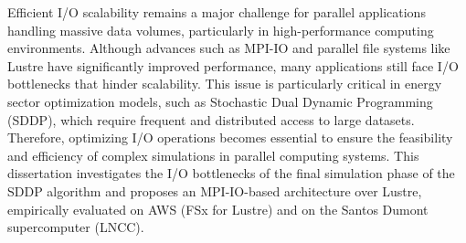 \documentclass[msc]{coppe}
\begin{document}
  \begin{abstract}
  A escalabilidade eficiente de E/S continua sendo um desafio crítico em
  aplicações paralelas de dados massivos, especialmente em sistemas de alto
  desempenho que lidam com grandes volumes de dados. Embora avanços como o uso
  de MPI-IO e sistemas de arquivos paralelos como o Lustre tenham contribuído
  significativamente, muitas aplicações ainda enfrentam gargalos que
  comprometem a performance. Esse problema é particularmente evidente em
  modelos de otimização utilizados no setor energético, como o SDDP, que
  demandam acesso frequente e distribuído a grandes conjuntos de dados. A
  eficiência da E/S torna-se, assim, um fator decisivo para a viabilidade e o
  desempenho de simulações complexas em ambientes paralelos. Esta dissertação
  investiga os gargalos de E/S da fase de simulação final do algoritmo SDDP e propõe uma arquitetura baseada em MPI-IO sobre Lustre, avaliada empiricamente nos
  ambientes AWS (FSx for Lustre) e Santos Dumont (LNCC).
  \end{abstract}

  \begin{foreignabstract}
  Efficient I/O scalability remains a major challenge for parallel
  applications handling massive data volumes, particularly in
  high-performance computing environments. Although advances such as MPI-IO
  and parallel file systems like Lustre have significantly improved
  performance, many applications still face I/O bottlenecks that hinder
  scalability. This issue is particularly critical in energy sector
  optimization models, such as Stochastic Dual Dynamic Programming (SDDP),
  which require frequent and distributed access to large datasets. Therefore,
  optimizing I/O operations becomes essential to ensure the feasibility and
  efficiency of complex simulations in parallel computing systems. This
  dissertation investigates the I/O bottlenecks of the final simulation
  phase of the SDDP algorithm and proposes an MPI-IO-based architecture
  over Lustre,
  empirically evaluated on AWS (FSx for Lustre) and on the Santos Dumont
  supercomputer (LNCC).
  \end{foreignabstract}

  \tableofcontents
  \listoffigures
  \listoftables
  \printlosymbols
  \printloabbreviations

  \mainmatter

\end{document}
